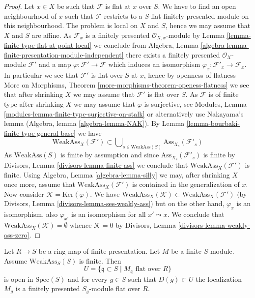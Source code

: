 \begin{proof}
Let $x \in X$ be such that $\mathcal{F}$ is flat at $x$ over $S$.
We have to find an open neighbourhood of $x$ such that $\mathcal{F}$ restricts
to a $S$-flat finitely presented module on this neighbourhood.
The problem is local on $X$ and $S$, hence we may assume that $X$ and $S$
are affine. As $\mathcal{F}_x$ is a finitely presented
$\mathcal{O}_{X, x}$-module by
Lemma \ref{lemma-finite-type-flat-at-point-local}
we conclude from
Algebra, Lemma \ref{algebra-lemma-finite-presentation-module-independent}
there exists a finitely presented $\mathcal{O}_X$-module $\mathcal{F}'$
and a map $\varphi : \mathcal{F}' \to \mathcal{F}$ which induces
an isomorphism $\varphi_x : \mathcal{F}'_x \to \mathcal{F}_x$. In particular
we see that $\mathcal{F}'$ is flat over $S$ at $x$, hence by openness
of flatness
More on Morphisms, Theorem \ref{more-morphisms-theorem-openess-flatness}
we see that after shrinking $X$ we may assume that
$\mathcal{F}'$ is flat over $S$. As $\mathcal{F}$ is of finite type
after shrinking $X$ we may assume that $\varphi$ is surjective, see
Modules, Lemma \ref{modules-lemma-finite-type-surjective-on-stalk}
or alternatively use Nakayama's lemma
(Algebra, lemma \ref{algebra-lemma-NAK}).
By
Lemma \ref{lemma-bourbaki-finite-type-general-base}
we have
$$
\text{WeakAss}_X(\mathcal{F}') \subset
\bigcup\nolimits_{s \in \text{WeakAss}(S)} \text{Ass}_{X_s}(\mathcal{F}'_s)
$$
As $\text{WeakAss}(S)$ is finite by assumption and since
$\text{Ass}_{X_s}(\mathcal{F}'_s)$ is finite by
Divisors, Lemma \ref{divisors-lemma-finite-ass}
we conclude that $\text{WeakAss}_X(\mathcal{F}')$ is finite. Using
Algebra, Lemma \ref{algebra-lemma-silly}
we may, after shrinking $X$ once more, assume that
$\text{WeakAss}_X(\mathcal{F}')$ is contained in the generalization
of $x$. Now consider $\mathcal{K} = \text{Ker}(\varphi)$. We have
$\text{WeakAss}_X(\mathcal{K}) \subset \text{WeakAss}_X(\mathcal{F}')$
(by
Divisors, Lemma \ref{divisors-lemma-ses-weakly-ass})
but on the other hand, $\varphi_x$ is an isomorphism, also $\varphi_{x'}$
is an isomorphism for all $x' \leadsto x$. We conclude that
$\text{WeakAss}_X(\mathcal{K}) = \emptyset$ whence
$\mathcal{K} = 0$ by
Divisors, Lemma \ref{divisors-lemma-weakly-ass-zero}.
\end{proof}

\begin{lemma}
\label{lemma-finite-type-flat-algebra}
Let $R \to S$ be a ring map of finite presentation.
Let $M$ be a finite $S$-module. Assume $\text{WeakAss}_S(S)$ is finite.
Then
$$
U = \{\mathfrak q \subset S \mid M_{\mathfrak q}\text{ flat over }R\}
$$
is open in $\text{Spec}(S)$ and for every $g \in S$ such that
$D(g) \subset U$ the localization $M_g$ is a finitely presented
$S_g$-module flat over $R$.
\end{lemma}

